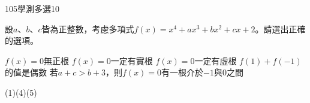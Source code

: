     \begin{QUESTION}
        \begin{ExamInfo}{105}{學測}{多選}{10}
        \end{ExamInfo}
        \begin{ExamAnsRateInfo}{34}{59}{28}{15}
        \end{ExamAnsRateInfo}
        \begin{QBODY}
            設$a$、$b$、$c$皆為正整數，考慮多項式$f(x)={{x}^{4}}+a{{x}^{3}}+b{{x}^{2}}+cx+2$。請選出正確的選項。
			\begin{QOPS}
				\QOP $f(x)=0$無正根
				\QOP $f(x)=0$一定有實根
				\QOP $f(x)=0$一定有虛根
				\QOP $f(1)+f(-1)$的值是偶數
				\QOP 若$a+c>b+3$，則$f(x)=0$有一根介於$-1$與0之間
			\end{QOPS}
        \end{QBODY}
        \begin{QFROMS}
        \end{QFROMS}
        \begin{QTAGS}\end{QTAGS}
        \begin{QANS}
            (1)(4)(5)
        \end{QANS}
        \begin{QSOLLIST}
        \end{QSOLLIST}
        \begin{QEMPTYSPACE}
        \end{QEMPTYSPACE}
    \end{QUESTION}
